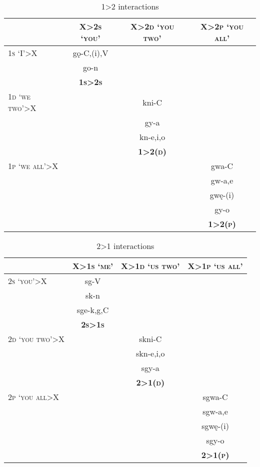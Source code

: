 \begin{table}
\caption{1>2 interactions}
\label{figtab:1:2 interactions}

\begin{tabular}{|l|ccc|}
\hline
& \multicolumn{1}{c|}{X>\textsc{2s `you'}} & \multicolumn{1}{c|}{X>\textsc{2d `you two'}} & X>\textsc{2p `you all'} \\
\hline
\textsc{1s `I'}>X & \multicolumn{1}{c|}{gǫ-C,(i),V }& \multicolumn{1}{c|}{} & \\
& \multicolumn{1}{c|}{go-n} &\multicolumn{1}{c|}{} & \\
& \multicolumn{1}{c|}{\textbf{\textsc{1s>2s}}} &\multicolumn{1}{c|}{} & \\
\cline{1-2}
\textsc{1d `we two'}>X & & \multicolumn{1}{c|}{kni-C} & \\
 & & \multicolumn{1}{c|}{gy-a} & \\
 & & \multicolumn{1}{c|}{kn-e,i,o} & \\
 & & \multicolumn{1}{c|}{\textbf{\textsc{1>2(d)}}} & \\
\cline{1-3}
\textsc{1p `we all'}>X & & & gwa-C \\
& & & gw-a,e \\
& & & gwę-(i) \\
& & & gy-o\\
& & & \textbf{\textsc{1>2(p)}}\\
\hline
\end{tabular}
\end{table}

\begin{table}
\caption{2>1 interactions}
\label{figtab:2:1 interactions}
\begin{tabular}{|l|ccc|}
\hline
& \multicolumn{1}{c|}{X>\textsc{1s `me'}} & \multicolumn{1}{c|}{X>\textsc{1d `us two'}} & \multicolumn{1}{c|}{X>\textsc{1p `us all'}}\\
\hline
\textsc{2s `you'}>X & \multicolumn{1}{c|}{sg-V} & \multicolumn{1}{c|}{} & \\
& \multicolumn{1}{c|}{sk-n} & \multicolumn{1}{c|}{} & \\
& \multicolumn{1}{c|}{sge-k,g,C} & \multicolumn{1}{c|}{} & \\
& \multicolumn{1}{c|}{\textbf{\textsc{2s>1s}}} & \multicolumn{1}{c|}{} & \\
\cline{1-2}
\textsc{2d `you two'}>X & & \multicolumn{1}{c|}{skni-C} & \\
& & \multicolumn{1}{c|}{skn-e,i,o} & \\
& & \multicolumn{1}{c|}{sgy-a} & \\
& & \multicolumn{1}{c|}{\textbf{\textsc{2>1(d)}}}& \\
\cline{1-3}
\textsc{2p `you all}>X & & & sgwa-C\\
& & & sgw-a,e \\
& & & sgwę-(i) \\
& & & sgy-o\\
& & & \textbf{\textsc{2>1(p)}}\\
\hline
\end{tabular}
\end{table}


